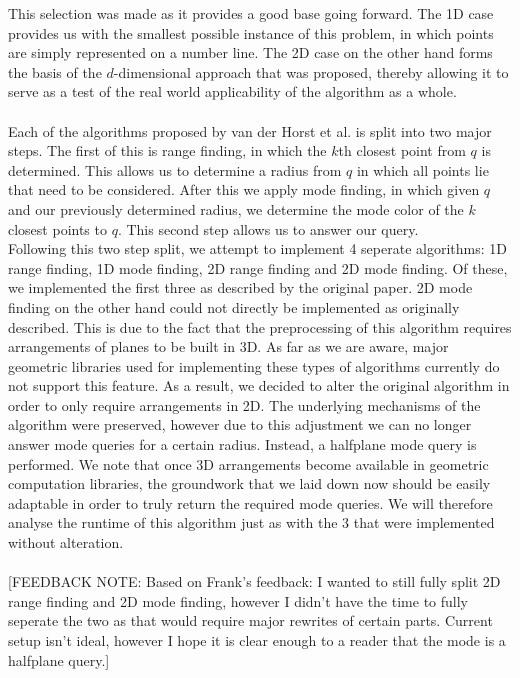 \documentclass{article}
\newcommand{\fbnote}[1]{{\color{blue}[FEEDBACK NOTE: #1]\\}}
\begin{document}
{    This selection was made as it provides a good base going forward. The 1D case provides us with the smallest possible instance of this problem, in which points are simply represented on a number line. The 2D case on the other hand forms the basis of the $d$-dimensional approach that was proposed, thereby allowing it to serve as a test of the real world applicability of the algorithm as a whole. \\\\
    Each of the algorithms proposed by van der Horst et al. is split into two major steps. The first of this is range finding, in which the $k$th closest point from $q$ is determined. This allows us to determine a radius from $q$ in which all points lie that need to be considered. After this we apply mode finding, in which given $q$ and our previously determined radius, we determine the mode color of the $k$ closest points to $q$. This second step allows us to answer our query. \\
    Following this two step split, we attempt to implement 4 seperate algorithms: 1D range finding, 1D mode finding, 2D range finding and 2D mode finding. Of these, we implemented the first three as described by the original paper. 2D mode finding on the other hand could not directly be implemented as originally described. This is due to the fact that the preprocessing of this algorithm requires arrangements of planes to be built in 3D. As far as we are aware, major geometric libraries used for implementing these types of algorithms currently do not support this feature. As a result, we decided to alter the original algorithm in order to only require arrangements in 2D. The underlying mechanisms of the algorithm were preserved, however due to this adjustment we can no longer answer mode queries for a certain radius. Instead, a halfplane mode query is performed. We note that once 3D arrangements become available in geometric computation libraries, the groundwork that we laid down now should be easily adaptable in order to truly return the required mode queries. We will therefore analyse the runtime of this algorithm just as with the 3 that were implemented without alteration. \\\\
    \fbnote{Based on Frank's feedback: I wanted to still fully split 2D range finding and 2D mode finding, however I didn't have the time to fully seperate the two as that would require major rewrites of certain parts. Current setup isn't ideal, however I hope it is clear enough to a reader that the mode is a halfplane query.}
}
\end{document}
